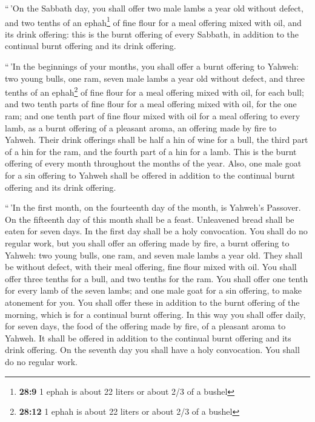  ``\,'On the Sabbath day, you shall offer two male lambs a
year old without defect, and two tenths of an ephah\footnote{\textbf{28:9}
  1 ephah is about 22 liters or about 2/3 of a bushel} of fine flour for
a meal offering mixed with oil, and its drink offering: 
this is the burnt offering of every Sabbath, in addition to the
continual burnt offering and its drink offering.

 ``\,'In the beginnings of your months, you shall offer a
burnt offering to Yahweh: two young bulls, one ram, seven male lambs a
year old without defect,  and three tenths of an
ephah\footnote{\textbf{28:12} 1 ephah is about 22 liters or about 2/3 of
  a bushel} of fine flour for a meal offering mixed with oil, for each
bull; and two tenth parts of fine flour for a meal offering mixed with
oil, for the one ram;  and one tenth part of fine flour
mixed with oil for a meal offering to every lamb, as a burnt offering of
a pleasant aroma, an offering made by fire to Yahweh. 
Their drink offerings shall be half a hin of wine for a bull, the third
part of a hin for the ram, and the fourth part of a hin for a lamb. This
is the burnt offering of every month throughout the months of the year.
 Also, one male goat for a sin offering to Yahweh shall
be offered in addition to the continual burnt offering and its drink
offering.

 ``\,'In the first month, on the fourteenth day of the
month, is Yahweh's Passover.  On the fifteenth day of
this month shall be a feast. Unleavened bread shall be eaten for seven
days.  In the first day shall be a holy convocation. You
shall do no regular work,  but you shall offer an
offering made by fire, a burnt offering to Yahweh: two young bulls, one
ram, and seven male lambs a year old. They shall be without defect,
 with their meal offering, fine flour mixed with oil. You
shall offer three tenths for a bull, and two tenths for the ram.
 You shall offer one tenth for every lamb of the seven
lambs;  and one male goat for a sin offering, to make
atonement for you.  You shall offer these in addition to
the burnt offering of the morning, which is for a continual burnt
offering.  In this way you shall offer daily, for seven
days, the food of the offering made by fire, of a pleasant aroma to
Yahweh. It shall be offered in addition to the continual burnt offering
and its drink offering.  On the seventh day you shall
have a holy convocation. You shall do no regular work.

